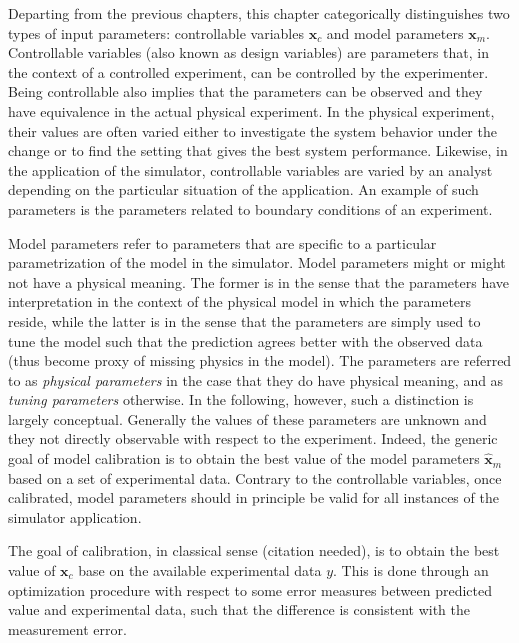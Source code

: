 Departing from the previous chapters, this chapter categorically distinguishes two types of input parameters: controllable variables $\bm{x}_c$ and model parameters $\bm{x}_m$.
Controllable variables (also known as design variables) are parameters that, in the context of a controlled experiment, can be controlled by the experimenter.
Being controllable also implies that the parameters can be observed and they have equivalence in the actual physical experiment.
In the physical experiment, their values are often varied either to investigate the system behavior under the change or to find the setting that gives the best system performance.
Likewise, in the application of the simulator, controllable variables are varied by an analyst depending on the particular situation of the application.
An example of such parameters is the parameters related to boundary conditions of an experiment.

Model parameters refer to parameters that are specific to a particular parametrization of the model in the simulator.
Model parameters might or might not have a physical meaning.
The former is in the sense that the parameters have interpretation in the context of the physical model in which the parameters reside, while the latter is in the sense that the parameters are simply used to tune the model such that the prediction agrees better with the observed data (thus become proxy of missing physics in the model).
The parameters are referred to as \emph{physical parameters} in the case that they do have physical meaning,
and as \emph{tuning parameters} otherwise.
In the following, however, such a distinction is largely conceptual.
Generally the values of these parameters are unknown and they not directly observable with respect to the experiment.
Indeed, the generic goal of model calibration is to obtain the best value of the model parameters $\hat{\bm{x}}_m$ based on a set of experimental data.
Contrary to the controllable variables, once calibrated, model parameters should in principle be valid for all instances of the simulator application.


The goal of calibration, in classical sense (citation needed), is to obtain the best value of $\bm{x}_c$ base on the available experimental data $y$.
This is done through an optimization procedure with respect to some error measures between predicted value and experimental data, such that the difference is consistent with the measurement error.

